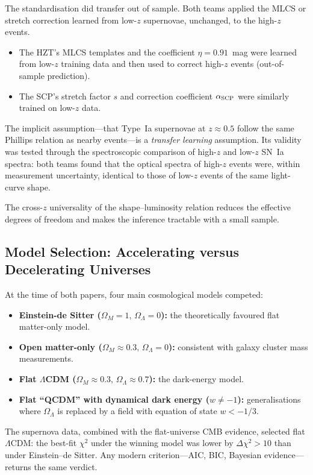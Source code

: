 \documentclass[12pt]{article}
\begin{document}
The standardisation did transfer out of sample.  Both teams applied the MLCS
or stretch correction learned from low-$z$ supernovae, unchanged, to the
high-$z$ events.
\begin{itemize}
  \item The HZT's MLCS templates and the coefficient $\eta = 0.91$~mag
    were learned from low-$z$ training data and then used to correct
    high-$z$ events (out-of-sample prediction).
  \item The SCP's stretch factor $s$ and correction coefficient
    $\alpha_{\rm SCP}$ were similarly trained on low-$z$ data.
\end{itemize}
The implicit assumption---that Type~Ia supernovae at $z\approx 0.5$
follow the same Phillips relation as nearby events---is a
\emph{transfer learning} assumption.  Its validity was tested through
the spectroscopic comparison of high-$z$ and low-$z$ SN~Ia spectra:
both teams found that the optical spectra of high-$z$ events were,
within measurement uncertainty, identical to those of low-$z$ events
of the same light-curve shape.

The cross-$z$ universality of the shape--luminosity relation reduces the
effective degrees of freedom and makes the inference tractable with a small
sample.

\subsection{Model Selection: Accelerating versus Decelerating Universes}

At the time of both papers, four main cosmological models competed:
\begin{itemize}
  \item \textbf{Einstein-de Sitter ($\Omega_M = 1,\,\Omega_\Lambda = 0$):}
    the theoretically favoured flat matter-only model.
  \item \textbf{Open matter-only ($\Omega_M \approx 0.3,\,\Omega_\Lambda =
    0$):} consistent with galaxy cluster mass measurements.
  \item \textbf{Flat $\Lambda$CDM ($\Omega_M \approx 0.3,\,\Omega_\Lambda
    \approx 0.7$):} the dark-energy model.
  \item \textbf{Flat ``QCDM'' with dynamical dark energy ($w\neq -1$):}
    generalisations where $\Omega_\Lambda$ is replaced by a field with
    equation of state $w < -1/3$.
\end{itemize}
The supernova data, combined with the flat-universe CMB evidence, selected
flat $\Lambda$CDM: the best-fit $\chi^2$ under the winning model was lower by
$\Delta\chi^2 > 10$ than under Einstein--de Sitter.  Any modern criterion---AIC,
BIC, Bayesian evidence---returns the same verdict.
\end{document}
